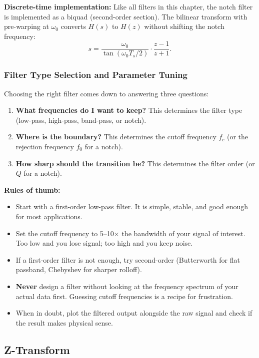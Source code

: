 \textbf{Discrete-time implementation:} Like all filters in this chapter, the notch filter is implemented as a biquad (second-order section). The bilinear transform with pre-warping at $\omega_0$ converts $H(s)$ to $H(z)$ without shifting the notch frequency:
\[
s = \frac{\omega_0}{\tan(\omega_0 T_s / 2)} \cdot \frac{z - 1}{z + 1}.
\]

\subsubsection{Filter Type Selection and Parameter Tuning}

Choosing the right filter comes down to answering three questions:
\begin{enumerate}
    \item \textbf{What frequencies do I want to keep?} This determines the filter type (low-pass, high-pass, band-pass, or notch).
    \item \textbf{Where is the boundary?} This determines the cutoff frequency $f_c$ (or the rejection frequency $f_0$ for a notch).
    \item \textbf{How sharp should the transition be?} This determines the filter order (or $Q$ for a notch).
\end{enumerate}

\textbf{Rules of thumb:}
\begin{itemize}
    \item Start with a first-order low-pass filter. It is simple, stable, and good enough for most applications.
    \item Set the cutoff frequency to 5--10$\times$ the bandwidth of your signal of interest. Too low and you lose signal; too high and you keep noise.
    \item If a first-order filter is not enough, try second-order (Butterworth for flat passband, Chebyshev for sharper rolloff).
    \item \textbf{Never} design a filter without looking at the frequency spectrum of your actual data first. Guessing cutoff frequencies is a recipe for frustration.
    \item When in doubt, plot the filtered output alongside the raw signal and check if the result makes physical sense.
\end{itemize}

\subsection{Z-Transform}

